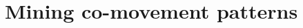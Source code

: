 \documentclass[
]{ceurart}
\begin{document}


\section{Mining co-movement patterns}\label{sec:mining}
\end{document}
